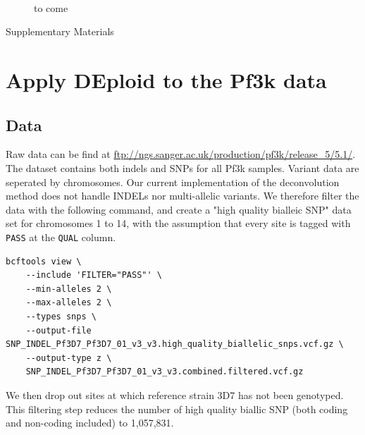 \documentclass{article}
\begin{document}
\begin{figure}[h]
\centering
{}\\

\caption{to come}

\end{figure}





\newpage

\begin{center}
\LARGE
Supplementary Materials
\end{center}



\section{Apply DEploid to the Pf3k data}
\subsection{Data}
Raw data can be find at \url{ftp://ngs.sanger.ac.uk/production/pf3k/release_5/5.1/}. The dataset contains both indels and SNPs for all Pf3k samples. Variant data are seperated by chromosomes. Our current implementation of the deconvolution method \citep{Zhu2017} does not handle INDELs nor multi-allelic variants. We therefore filter the data with the following command, and create a "high quality bialleic SNP" data set for chromosomes 1 to 14, with the assumption that every site is tagged with {\tt PASS} at the {\tt QUAL} column.
\linespread{1}
\begin{lstlisting}
bcftools view \
    --include 'FILTER="PASS"' \
    --min-alleles 2 \
    --max-alleles 2 \
    --types snps \
    --output-file SNP_INDEL_Pf3D7_Pf3D7_01_v3_v3.high_quality_biallelic_snps.vcf.gz \
    --output-type z \
    SNP_INDEL_Pf3D7_Pf3D7_01_v3_v3.combined.filtered.vcf.gz
\end{lstlisting}
\linespread{1.5}

We then drop out sites at which reference strain 3D7 has not been genotyped. This filtering step reduces the number of high quality biallic SNP (both coding and non-coding included) to 1,057,831.
\end{document}
